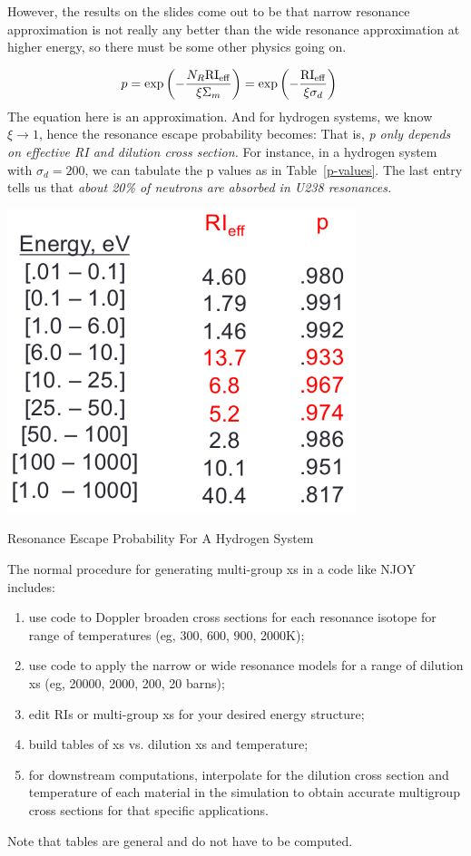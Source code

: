 \documentclass{school-22.211-notes}
\begin{document}
However, the results on the slides come out to be that narrow resonance approximation is not really any better than the wide resonance approximation at higher energy, so there must be some other physics going on. 


\begin{align}
p &= \exp \left( - \frac{N_R \mathrm{RI}_{\mathrm{eff}}}{\xi \Sigma_m} \right)  = \exp \left( - \frac{\mathrm{RI}_{\mathrm{eff}}}{\xi \sigma_d} \right)
\end{align}
The equation here is an approximation. And for hydrogen systems, we know $\xi \to 1$, hence the resonance escape probability becomes:
That is, \textit{p only depends on effective RI and dilution cross section.} For instance, in a hydrogen system with $\sigma_d = 200$, we can tabulate the p values as in Table~\ref{p-values}. The last entry tells us that \textit{about 20\% of neutrons are absorbed in U238 resonances.}
\begin{table}
  \centering
  \includegraphics[width=4in]{images/resonance-escape-probability.png}
  \caption{Resonance Escape Probability For A Hydrogen System} \label{p-values}
\end{table}

The normal procedure for generating multi-group xs in a code like NJOY includes:
\begin{enumerate}
\item use code to Doppler broaden cross sections for each resonance isotope for range of temperatures (eg, 300, 600, 900, 2000K); 
\item use code to apply the narrow or wide resonance models for a range of dilution xs (eg, 20000, 2000, 200, 20 barns); 
\item edit RIs or multi-group xs for your desired energy structure; 
\item build tables of xs vs. dilution xs and temperature;
\item for downstream computations, interpolate for the dilution cross section and temperature of each material in the simulation to obtain accurate multigroup cross sections for that specific applications. 
\end{enumerate}
Note that tables are general and do not have to be computed. 
\end{document}
